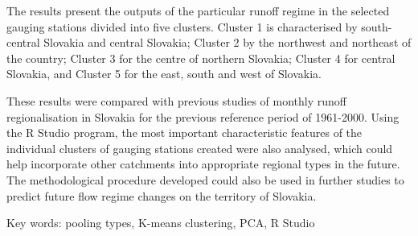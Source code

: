 The results present the outputs of the particular runoff regime in the selected gauging stations divided into five clusters. Cluster 1 is characterised by south-central Slovakia and central Slovakia; Cluster 2 by the northwest and northeast of the country; Cluster 3 for the centre of northern Slovakia; Cluster 4 for central Slovakia, and Cluster 5 for the east, south and west of Slovakia.

These results were compared with previous studies of monthly runoff regionalisation in Slovakia for the previous reference period of 1961-2000. Using the R Studio program, the most important characteristic features of the individual clusters of gauging stations created were also analysed, which could help incorporate other catchments into appropriate regional types in the future. The methodological procedure developed could also be used in further studies to predict future flow regime changes on the territory of Slovakia.

Key words: pooling types, K-means clustering, PCA, R Studio

